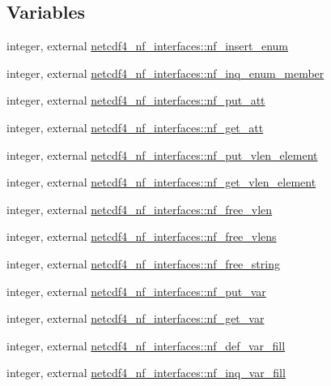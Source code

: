 \subsection*{Variables}
\begin{DoxyCompactItemize}
\item 
integer, external \hyperlink{namespacenetcdf4__nf__interfaces_a1e892cb2a8ec57c37cc14571da968d08}{netcdf4\+\_\+nf\+\_\+interfaces\+::nf\+\_\+insert\+\_\+enum}
\item 
integer, external \hyperlink{namespacenetcdf4__nf__interfaces_a7701386d944a559ae2c66e83e2973318}{netcdf4\+\_\+nf\+\_\+interfaces\+::nf\+\_\+inq\+\_\+enum\+\_\+member}
\item 
integer, external \hyperlink{namespacenetcdf4__nf__interfaces_a3a7bd7be950c6922e8f88678b4bfdf8a}{netcdf4\+\_\+nf\+\_\+interfaces\+::nf\+\_\+put\+\_\+att}
\item 
integer, external \hyperlink{namespacenetcdf4__nf__interfaces_abb9bde5027d3ac2c489b0a972dcb6198}{netcdf4\+\_\+nf\+\_\+interfaces\+::nf\+\_\+get\+\_\+att}
\item 
integer, external \hyperlink{namespacenetcdf4__nf__interfaces_a66368d19b7489f6051a9bfc57f6c6fe5}{netcdf4\+\_\+nf\+\_\+interfaces\+::nf\+\_\+put\+\_\+vlen\+\_\+element}
\item 
integer, external \hyperlink{namespacenetcdf4__nf__interfaces_a81bf2e69498696b98324738ee6f43829}{netcdf4\+\_\+nf\+\_\+interfaces\+::nf\+\_\+get\+\_\+vlen\+\_\+element}
\item 
integer, external \hyperlink{namespacenetcdf4__nf__interfaces_a79bedc621cc77df74b1d2af59c274a6c}{netcdf4\+\_\+nf\+\_\+interfaces\+::nf\+\_\+free\+\_\+vlen}
\item 
integer, external \hyperlink{namespacenetcdf4__nf__interfaces_acd6178ea9e84f98d21b275192fc6c611}{netcdf4\+\_\+nf\+\_\+interfaces\+::nf\+\_\+free\+\_\+vlens}
\item 
integer, external \hyperlink{namespacenetcdf4__nf__interfaces_a37497a28283a014b32835857d07519a5}{netcdf4\+\_\+nf\+\_\+interfaces\+::nf\+\_\+free\+\_\+string}
\item 
integer, external \hyperlink{namespacenetcdf4__nf__interfaces_a9d318b0273c1b17703f13ac2bddf9c52}{netcdf4\+\_\+nf\+\_\+interfaces\+::nf\+\_\+put\+\_\+var}
\item 
integer, external \hyperlink{namespacenetcdf4__nf__interfaces_a8658e94b204c7977d7e6c083d20f9426}{netcdf4\+\_\+nf\+\_\+interfaces\+::nf\+\_\+get\+\_\+var}
\item 
integer, external \hyperlink{namespacenetcdf4__nf__interfaces_a806f80a9cb5a64ad0498074b159b4569}{netcdf4\+\_\+nf\+\_\+interfaces\+::nf\+\_\+def\+\_\+var\+\_\+fill}
\item 
integer, external \hyperlink{namespacenetcdf4__nf__interfaces_a2cd40ac572052bbd28dd915f9089b77f}{netcdf4\+\_\+nf\+\_\+interfaces\+::nf\+\_\+inq\+\_\+var\+\_\+fill}
\end{DoxyCompactItemize}
